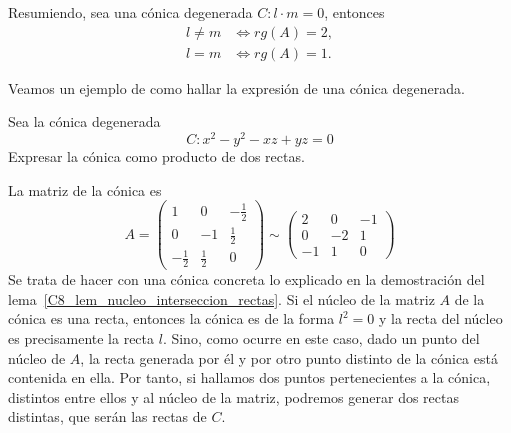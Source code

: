Resumiendo, sea una cónica degenerada $C:l\cdot m=0$, entonces
\begin{equation}
\begin{split}
l\not=m &\Leftrightarrow rg(A)=2,\\
l=m&\Leftrightarrow rg(A)=1.
\end{split}
\end{equation}

Veamos un ejemplo de como hallar la expresión de una cónica degenerada.

\begin{exa}
	Sea la cónica degenerada
	\begin{equation}
	C: x^2-y^2-xz+yz=0
	\end{equation}
	Expresar la cónica como producto de dos rectas.
	
	La matriz de la cónica es
	\begin{equation}
	A=\left( \begin{array}{rrr}
	1&0&-\frac{1}{2}\\
	0&-1&\frac{1}{2}\\
	-\frac{1}{2}&\frac{1}{2}& 0
	\end{array}\right) \sim
	\left( \begin{array}{rrr}
	2&0&-1\\
	0&-2&1\\
	-1&1&0
	\end{array}\right)
	\end{equation}
	Se trata de hacer con una cónica concreta lo explicado en la demostración del lema~\ref{C8_lem_nucleo_interseccion_rectas}. Si el núcleo de la matriz $A$ de la cónica es una recta, entonces la cónica es de la forma $l^2=0$ y la recta del núcleo es precisamente la recta $l$. Sino, como ocurre en este caso, dado un punto del núcleo de $A$, la recta generada por él y por otro punto distinto de la cónica está contenida en ella. Por tanto, si hallamos dos puntos pertenecientes a la cónica, distintos entre ellos y al núcleo de la matriz, podremos generar dos rectas distintas, que serán las rectas de $C$.
	

\end{exa}
